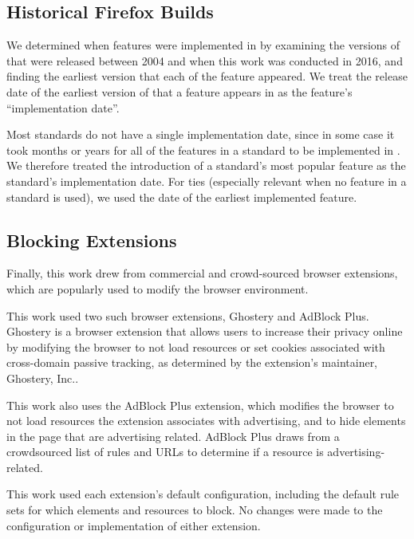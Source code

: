 \subsection{Historical Firefox Builds}
We determined when features were implemented in \FF by
examining the \numfirefoxes versions of \FF that were released between 2004
and when this work was conducted in 2016, and finding the earliest version
that each of the \numfeatures feature appeared.
We treat the release date of the earliest version of
\FF that a feature appears in as the feature's ``implementation date''.

Most standards do not have a single implementation date, since in some case
it took months or years for all of the features in a standard to be
implemented in \FF.  We therefore treated the introduction of a standard's
most popular feature as the standard's implementation date. For ties
(especially relevant when no feature in a standard is used), we
used the date of the earliest implemented feature.


\subsection{Blocking Extensions}
\label{measurement:data-sources:data-extensions}
Finally, this work drew from commercial and crowd-sourced browser extensions,
which are popularly used to modify the browser environment.

This work used two such browser extensions, Ghostery and AdBlock Plus.
Ghostery is a browser extension that allows users to increase their privacy
online by modifying the browser to not load resources or set cookies associated
with cross-domain passive tracking, as determined by the extension's
maintainer, Ghostery, Inc..

This work also uses the AdBlock Plus extension, which modifies
the browser to not load resources the extension associates with
advertising, and to hide elements in the page that are advertising related.
AdBlock Plus draws from a crowdsourced list of rules and URLs to determine
if a resource is advertising-related.

This work used each extension's default configuration, including the default
rule sets for which elements and resources to block.  No changes were made to
the configuration or implementation of either extension.
